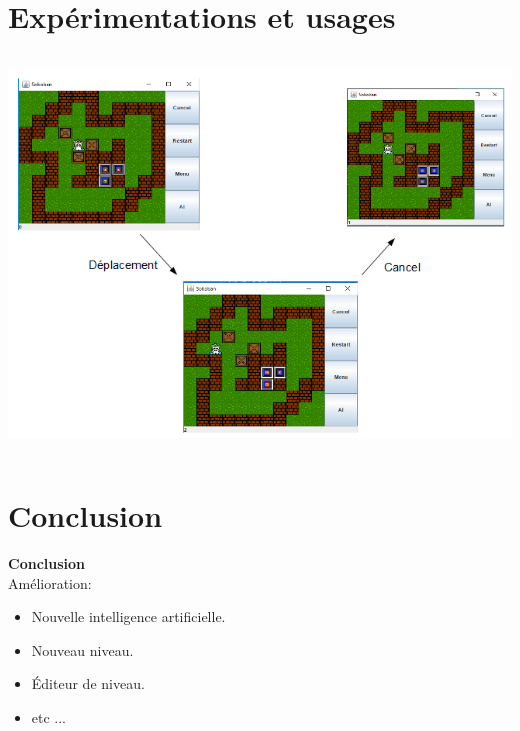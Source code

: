 \documentclass{beamer}
\begin{document}
\section{Expérimentations et usages}
\begin{frame}
\begin{column}{8cm}
  \includegraphics[scale=0.6]{Test3.PNG}
\end{column}
\end{frame}
\section{Conclusion}
  
\begin{frame}
\textbf{Conclusion}\\
 \vspace{0.8cm}
Amélioration:
\begin{itemize}
\item Nouvelle intelligence artificielle.
\item Nouveau niveau.
\item Éditeur de niveau.
\item etc ...
\end{itemize}
\end{frame}
\end{document}
